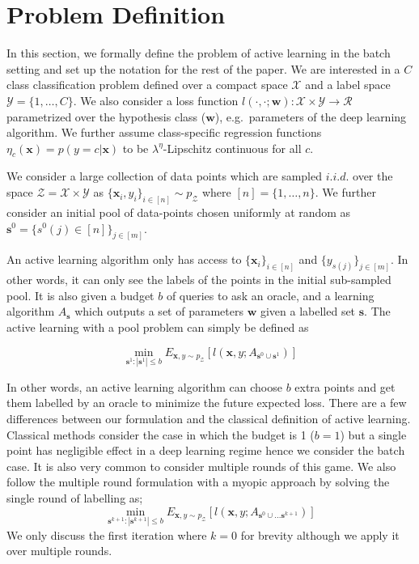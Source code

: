 \documentclass{article} \usepackage{iclr2018_conference,times}
\begin{document}
\section{Problem Definition} In this section, we formally define the problem of active learning in the batch setting and set
up the notation for the rest of the paper. We are interested in a $C$ class classification problem defined over a
compact space $\mathcal{X}$ and a label space  $\mathcal{Y}=\{1,\ldots,C\}$. We also consider a loss function
$l(\cdot,\cdot;\mathbf{w}):\mathcal{X}\times \mathcal{Y} \rightarrow \mathcal{R}$ parametrized over the hypothesis class
($\mathbf{w}$), e.g.\ parameters of the deep learning algorithm. We further assume class-specific regression functions
$\eta_c(\mathbf{x})=p(y=c|\mathbf{x})$ to be \mbox{$\lambda^\eta$-Lipschitz} continuous for all $c$.

We consider a large collection of data points which are sampled $i.i.d.$ over the space
$\mathcal{Z}=\mathcal{X}\times\mathcal{Y}$ as \mbox{$\{\mathbf{x}_i,y_i\}_{i \in [n]} \sim p_\mathcal{Z}$} where
$[n]=\{1,\ldots,n\}$. We further consider an initial pool of data-points chosen uniformly at random as
\mbox{$\mathbf{s}^0=\{s^0(j) \in [n]\}_{j \in [m]}$}.

An active learning algorithm only has access to $\{\mathbf{x}_i\}_{i \in [n]}$ and $\{y_{s(j)}\}_{j \in [m] }$. In other
words, it can only see the labels of the points in the initial sub-sampled pool. It is also given a budget $b$ of
queries to ask an oracle, and a learning algorithm $A_{\mathbf{s}}$ which outputs a set of parameters $\mathbf{w}$ given
a labelled set $\mathbf{s}$. The active learning with a pool problem can simply be defined as 

\begin{equation} 
    \min_{\mathbf{s}^1 : |\mathbf{s}^1| \leq b} E_{\mathbf{x},y \sim p_\mathcal{Z}} [l(\mathbf{x},y;
A_{\mathbf{s}^0 \cup \mathbf{s}^1})] 
    \label{eq:expectation}
\end{equation} 

In other words, an active learning algorithm can choose $b$ extra points and get them labelled by an oracle to minimize
the future expected loss. There are a few differences between our formulation and the classical definition of active
learning. Classical methods consider the case in which the budget is 1 ($b=1$) but a single point has negligible effect
in a deep learning regime hence we consider the batch case. It is also very common to consider multiple rounds of this
game. We also follow the multiple round formulation with a myopic approach by solving the single round of labelling as;
\begin{equation} \min_{\mathbf{s}^{k+1} : |\mathbf{s}^{k+1}| \leq b} E_{\mathbf{x},y \sim p_\mathcal{Z}}
[l(\mathbf{x},y;A_{\mathbf{s}^{0} \cup \ldots  \mathbf{s}^{k+1}})] \end{equation}
We only discuss the first iteration where $k=0$ for brevity although we apply it over multiple rounds. 
\end{document}
